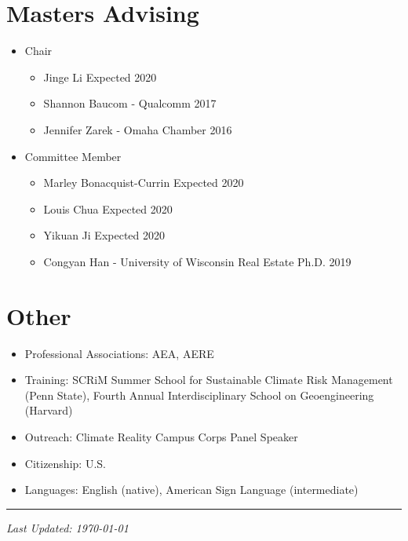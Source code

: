 \documentclass{res} %
\begin{document}
\begin{resume}
\section{Masters Advising}
\begin{itemize}
	\item[] Chair
	\vspace{-0.05in}
	\begin{itemize} \itemsep -1pt
		\item[] Jinge Li \hfill Expected 2020
		\item[] Shannon Baucom - Qualcomm \hfill 2017
		\item[] Jennifer Zarek - Omaha Chamber \hfill 2016
	\end{itemize}
	\vspace{-0.05in}
	\item[] Committee Member
	\vspace{-0.05in}
	\begin{itemize} \itemsep -1pt
		\item[] Marley Bonacquist-Currin \hfill Expected 2020
		\item[] Louis Chua \hfill Expected 2020
		\item[] Yikuan Ji \hfill Expected 2020
		\item[] Congyan Han - University of Wisconsin Real Estate Ph.D. \hfill 2019
	\end{itemize}
\end{itemize}
\vspace{-.075in}

\section{Other}

\begin{itemize}
	\item[] Professional Associations: AEA, AERE
	\item[] Training: SCRiM Summer School for Sustainable Climate Risk Management (Penn State), Fourth Annual Interdisciplinary School on Geoengineering (Harvard)
	\item[] Outreach: Climate Reality Campus Corps Panel Speaker
	\item[] Citizenship: U.S.
	\item[] Languages: English (native), American Sign Language (intermediate)
\end{itemize}
\hrule

\vspace{0.1in} %



\centerline{\emph{Last Updated: \today}}
\pagebreak



\end{resume}
\end{document}
